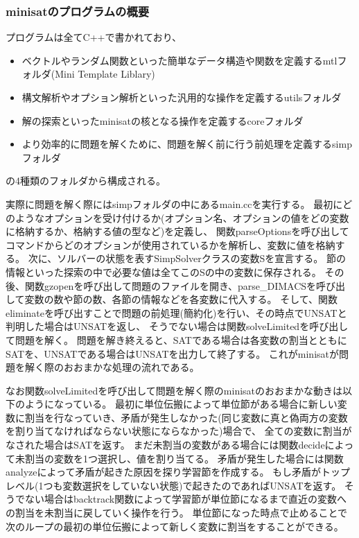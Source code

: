 









\subsubsection{minisatのプログラムの概要}

プログラムは全てC++で書かれており、
\begin{itemize}
	\item ベクトルやランダム関数といった簡単なデータ構造や関数を定義するmtlフォルダ(Mini Template Liblary)
	\item 構文解析やオプション解析といった汎用的な操作を定義するutilsフォルダ
	\item 解の探索といったminisatの核となる操作を定義するcoreフォルダ
	\item より効率的に問題を解くために、問題を解く前に行う前処理を定義するsimpフォルダ
\end{itemize}
の4種類のフォルダから構成される。

実際に問題を解く際にはsimpフォルダの中にあるmain.ccを実行する。
最初にどのようなオプションを受け付けるか(オプション名、オプションの値をどの変数に格納するか、格納する値の型など)を定義し、
関数parseOptionsを呼び出してコマンドからどのオプションが使用されているかを解析し、変数に値を格納する。
次に、ソルバーの状態を表すSimpSolverクラスの変数Sを宣言する。
節の情報といった探索の中で必要な値は全てこのSの中の変数に保存される。
その後、関数gzopenを呼び出して問題のファイルを開き、parse\_DIMACSを呼び出して変数の数や節の数、各節の情報などを各変数に代入する。
そして、関数eliminateを呼び出すことで問題の前処理(簡約化)を行い、その時点でUNSATと判明した場合はUNSATを返し、
そうでない場合は関数solveLimitedを呼び出して問題を解く。
問題を解き終えると、SATである場合は各変数の割当とともにSATを、UNSATである場合はUNSATを出力して終了する。
これがminisatが問題を解く際のおおまかな処理の流れである。

なお関数solveLimitedを呼び出して問題を解く際のminisatのおおまかな動きは以下のようになっている。
最初に単位伝搬によって単位節がある場合に新しい変数に割当を行なっていき、矛盾が発生しなかった(同じ変数に真と偽両方の変数を割り当てなければならない状態にならなかった)場合で、
全ての変数に割当がなされた場合はSATを返す。
まだ未割当の変数がある場合には関数decideによって未割当の変数を1つ選択し、値を割り当てる。
矛盾が発生した場合には関数analyzeによって矛盾が起きた原因を探り学習節を作成する。
もし矛盾がトップレベル(1つも変数選択をしていない状態)で起きたのであればUNSATを返す。
そうでない場合はbacktrack関数によって学習節が単位節になるまで直近の変数への割当を未割当に戻していく操作を行う。
単位節になった時点で止めることで次のループの最初の単位伝搬によって新しく変数に割当をすることができる。





